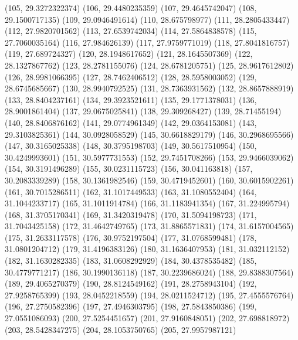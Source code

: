 {					(105, 29.3272322374)
					(106, 29.4480235359)
					(107, 29.4645742047)
					(108, 29.1500717135)
					(109, 29.0946491614)
					(110, 28.675798977)
					(111, 28.2805433447)
					(112, 27.9820701562)
					(113, 27.6539742034)
					(114, 27.5864838578)
					(115, 27.7060035164)
					(116, 27.984626139)
					(117, 27.9759771019)
					(118, 27.8041816757)
					(119, 27.689724327)
					(120, 28.1948617652)
					(121, 28.1645507369)
					(122, 28.1327867762)
					(123, 28.2781155076)
					(124, 28.6781205751)
					(125, 28.9617612802)
					(126, 28.9981066395)
					(127, 28.7462406512)
					(128, 28.5958003052)
					(129, 28.6745685667)
					(130, 28.9940792525)
					(131, 28.7363931562)
					(132, 28.8657888919)
					(133, 28.8404237161)
					(134, 29.3923521611)
					(135, 29.1771378031)
					(136, 28.9001861404)
					(137, 29.0675025841)
					(138, 29.309268427)
					(139, 28.71455194)
					(140, 28.8406876162)
					(141, 29.0774961349)
					(142, 29.0364153081)
					(143, 29.3103825361)
					(144, 30.0928058529)
					(145, 30.6618829179)
					(146, 30.2968695566)
					(147, 30.3165025338)
					(148, 30.3795198703)
					(149, 30.5617510954)
					(150, 30.4249993601)
					(151, 30.5977731553)
					(152, 29.7451708266)
					(153, 29.9466039062)
					(154, 30.3191496289)
					(155, 30.0231115723)
					(156, 30.041163818)
					(157, 30.2083339289)
					(158, 30.1361982546)
					(159, 30.4719452601)
					(160, 30.6015902261)
					(161, 30.7015286511)
					(162, 31.1017449533)
					(163, 31.1080552404)
					(164, 31.1044233717)
					(165, 31.1011914784)
					(166, 31.1183941354)
					(167, 31.224995794)
					(168, 31.3705170341)
					(169, 31.3420319478)
					(170, 31.5094198723)
					(171, 31.7043425158)
					(172, 31.4642749765)
					(173, 31.8865571831)
					(174, 31.6157004565)
					(175, 31.2633117578)
					(176, 30.9752197504)
					(177, 31.0768599481)
					(178, 31.0801204712)
					(179, 31.4196383126)
					(180, 31.1636407953)
					(181, 31.032112152)
					(182, 31.1630282335)
					(183, 31.0608292929)
					(184, 30.4378535482)
					(185, 30.4779771217)
					(186, 30.1990136118)
					(187, 30.2239686024)
					(188, 29.8388307564)
					(189, 29.4065270379)
					(190, 28.8124549162)
					(191, 28.2758943104)
					(192, 27.9258765399)
					(193, 28.0452218559)
					(194, 28.0211524712)
					(195, 27.4555576764)
					(196, 27.2750582396)
					(197, 27.4946303795)
					(198, 27.5843850386)
					(199, 27.0551086093)
					(200, 27.5254451657)
					(201, 27.9160848051)
					(202, 27.698818972)
					(203, 28.5428347275)
					(204, 28.1053750765)
					(205, 27.9957987121)
}
